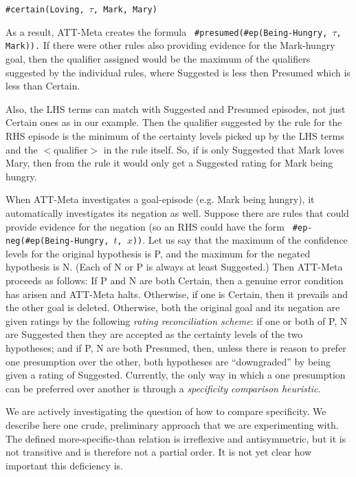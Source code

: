\begin{tabbing}
\quad \={\tt \#certain(Loving, $\tau$, Mark, Mary)}\\
\end{tabbing}

As a result, ATT-Meta creates the formula {\tt
\#presumed(\#ep(Being-Hungry, $\tau$, Mark)).} If there were other rules also
providing evidence for the Mark-hungry goal, then the qualifier assigned would
be the maximum of the qualifiers suggested by the individual rules, where
Suggested is less then Presumed which is less than Certain.

Also, the LHS terms can match with Suggested and Presumed episodes,
not just Certain ones as in our example. Then the qualifier suggested by
the rule for the RHS episode is the minimum of the certainty levels picked up
by the LHS terms and the $<$qualifier$>$ in the rule itself. So, if is only
Suggested that Mark loves Mary, then from the rule it would only get a
Suggested rating for Mark being hungry.

When ATT-Meta investigates a
goal-episode (e.g. Mark being hungry), it automatically investigates its
negation as well. Suppose there are rules that could provide evidence for the
negation (so an RHS could have the form {\tt
\#ep-neg(\#ep(Being-Hungry, $t$, $x$))}.  Let us say that the maximum
of the confidence levels for the original hypothesis is P, and the maximum for
the negated hypothesis is N. (Each of N or P is always at least Suggested.)
Then ATT-Meta proceeds as follows: If P and N are both  Certain, then a
genuine error condition has arisen and ATT-Meta halts.  Otherwise, if one is
Certain, then it prevails and the other goal is deleted.  Otherwise, both
the original goal and its negation are given ratings by the following {\it
rating reconciliation scheme}:
%
if one or both of P, N are Suggested then they are accepted as the
certainty levels of the two hypotheses;
%
and if P, N are both Presumed, then, unless there is reason to prefer one
presumption over the other, both hypotheses are ``downgraded'' by being given a
rating of Suggested.  Currently, the only way in which a one presumption can be
preferred over another is through a {\it specificity comparison heuristic}. 

We are actively investigating the question of how to compare
specificity.  We describe here one crude, preliminary
approach that we are experimenting with. The defined more-specific-than
relation is irreflexive and antisymmetric, but it is not transitive and is
therefore not a partial order. It is not yet clear how important this
deficiency is. 

